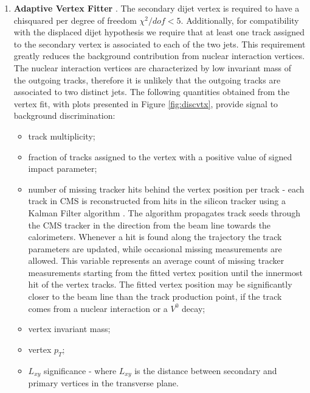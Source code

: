 \begin{enumerate}

\item{\bf Adaptive Vertex Fitter}
\label{subsec:AVF}
\cite{Frühwirth:1027031}. The secondary dijet vertex is required to have a chisquared per degree of freedom 
$\chi^2/dof < 5$. Additionally, for compatibility with the displaced dijet hypothesis we require that at least 
one track assigned
 to the secondary vertex is associated to each of the two jets. 
This requirement greatly reduces the background contribution
from nuclear interaction vertices. The nuclear interaction vertices are characterized by low invariant mass
of the outgoing tracks, therefore it is unlikely that the outgoing tracks are associated to two distinct jets. 
The following quantities obtained from the vertex fit, with plots presented in Figure
\ref{fig:discvtx}, provide signal to background discrimination:
\begin{itemize}
 \item track multiplicity;
 \item fraction of tracks assigned to the vertex with a positive value of signed impact parameter;
 \item number of missing tracker hits behind the vertex position per track - each track in CMS is reconstructed 
from hits in the silicon tracker using a Kalman Filter algorithm \cite{CMS_IN_2007-065}. The algorithm propagates
 track seeds through the CMS tracker in the direction from the beam line towards the calorimeters. Whenever a hit 
is found along the trajectory the track parameters are updated, while occasional missing measurements 
are allowed. 
This variable represents an average count of missing tracker measurements 
starting from the fitted vertex position until the innermost hit of the vertex tracks. The fitted vertex position
may be significantly closer to the beam line than the track production point, if the track comes from a nuclear
 interaction or a $V^0$ decay;
 \item vertex invariant mass;
 \item vertex $p_T$;
 \item $L_{xy}$ significance - where $L_{xy}$ is the distance between secondary and primary vertices
in the transverse plane.
\end{itemize}



\end{enumerate}
